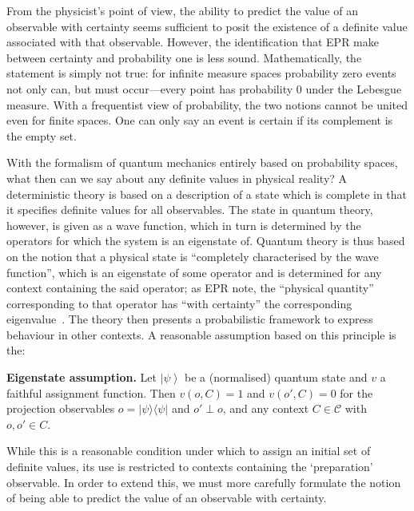 \documentclass[%
 preprint,
 showpacs,
 showkeys,
 amsmath,
 amssymb,
 aps,
 pra,
 ]{revtex4-1}
\theoremstyle{definition}
\newcommand{\ket}[1]{\left| #1 \right>}
\newcommand{\oprod}[2]{| #1 \rangle\langle #2 |}
\begin{document}
From the physicist's point of view, the ability to predict the value of an observable with certainty seems sufficient to posit the existence of a definite value associated with that observable. However, the identification that EPR make between certainty and probability one is less sound.
Mathematically, the statement is simply not true: for infinite  measure spaces probability zero events not only can, but must occur---every point has probability 0 under the Lebesgue measure. With a frequentist view of probability, the two notions cannot be united even for finite spaces. One can only say an event is certain if its complement is the empty set.

With the formalism of quantum mechanics entirely based on probability spaces, what then can we say about any definite values in physical reality?
A deterministic theory is based on a description of a state which is complete in that it specifies definite values for all observables.
The state in quantum theory, however, is given as a wave function, which in turn is determined by the operators
for which the system is an eigenstate of. Quantum theory is thus based on the notion that a physical state is
``completely characterised by the wave function'',
which is an eigenstate of some operator and is determined for any context containing the said operator; as EPR note,
the ``physical quantity'' corresponding to that operator has ``with certainty'' the corresponding eigenvalue~\cite[pp. 778]{epr}.
The theory then presents a probabilistic framework to express behaviour in other contexts.
A reasonable assumption based on this principle is the:

\textbf{Eigenstate assumption.} Let $\ket{\psi}$ be a (normalised) quantum state and $v$ a faithful assignment function. Then $v(o,C)=1$ and $v(o',C)=0$ for the projection observables $o=\oprod{\psi}{\psi}$ and $o'\perp o$, and any context $C\in\mathcal{C}$ with $o,o'\in C$.

While this is a reasonable condition under which to assign an initial set of definite values,
its use is restricted to contexts containing the `preparation' observable.
In order to extend this, we must more carefully formulate the notion of being able to predict the value of an observable with certainty.

\end{document}
